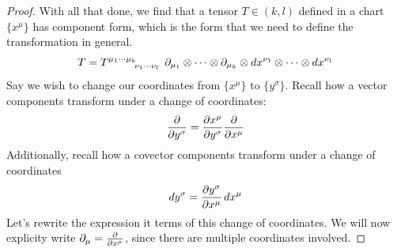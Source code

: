 \begin{solution_pset}
\begin{proof}
		With all that done,
		we find that a tensor $T\in(k,l)$ defined in a chart $\{x^\mu\}$ 
		has component form, which is the form that we need 
		to define the transformation in general.
		\begin{equation}
			\label{eq:tensor-component-form}
			T = 
			T\indices{^{\mu_1\cdots \mu_k}_{\nu_1\cdots\nu_l}}\ 
			\p_{\mu_1}\otimes \cdots \otimes \p_{\mu_k}
			\otimes
			\dd{x^{\nu_1}}\otimes \cdots \otimes \dd{x^{\nu_1}}
		\end{equation}
		Say we wish to change our coordinates from $\{x^\mu\}$ to $\{y^\sigma\}$.
		Recall how a vector components transform under a change of coordinates:
		\begin{equation}
			\label{eq:vector-transform}
			\pdv{}{y^\sigma} = \pdv{x^\mu}{y^\sigma} \pdv{}{x^\mu} 
		\end{equation}
		Additionally, recall how a covector components transform under a change 
		of coordinates
		\begin{equation}
			\label{eq:covector-transform}
			\dd{y^\sigma} = \pdv{y^\sigma}{x^\mu}\dd{x^\mu} 
		\end{equation}
		Let's rewrite the expression it terms of this change of coordinates.
		We will now explicity write $\partial_\mu = \pdv{}{x^\mu}$, since there 
		are multiple coordinates involved.


\end{proof}
\end{solution_pset}
